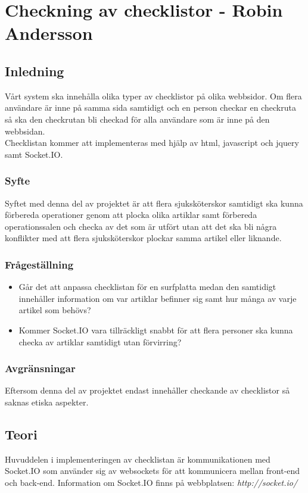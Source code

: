 \section{Checkning av checklistor - Robin Andersson}
\subsection{Inledning}
Vårt system ska innehålla olika typer av checklistor på olika webbsidor. Om flera användare är inne på samma sida samtidigt och en person checkar en checkruta så ska den checkrutan bli checkad för alla användare som är inne på den webbsidan.\\

Checklistan kommer att implementeras med hjälp av html, javascript och jquery samt Socket.IO.

\subsubsection{Syfte}
Syftet med denna del av projektet är att flera sjuksköterskor samtidigt ska kunna förbereda operationer genom att plocka olika artiklar samt förbereda operationssalen och checka av det som är utfört utan att det ska bli några konflikter med att flera sjuksköterskor plockar samma artikel eller liknande.

\subsubsection{Frågeställning}
\begin{itemize}
\item Går det att anpassa checklistan för en surfplatta medan den samtidigt innehåller information om var artiklar befinner sig samt hur många av varje artikel som behövs?
\item Kommer Socket.IO vara tillräckligt snabbt för att flera personer ska kunna checka av artiklar samtidigt utan förvirring?
\end{itemize}

\subsubsection{Avgränsningar}
Eftersom denna del av projektet endast innehåller checkande av checklistor så saknas etiska aspekter.

\subsection{Teori}
Huvuddelen i implementeringen av checklistan är kommunikationen med Socket.IO som använder sig av websockets för att kommunicera mellan front-end och back-end. Information om Socket.IO finns på webbplatsen: \textit{http://socket.io/}


